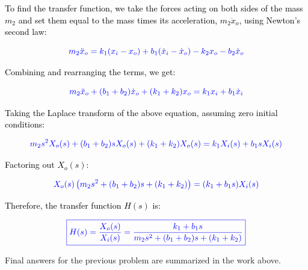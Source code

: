 \documentclass[12pt]{article}
\begin{document}
\noindent
\textcolor{black}{To find the transfer function, we take the forces acting on both sides of the mass \( m_2 \) and set them equal to the mass times its acceleration, \( m_2 \ddot{x}_o \), using Newton’s second law:}

\[
	\textcolor{blue}{m_2 \ddot{x}_o = k_1 (x_i - x_o) + b_1 (\dot{x}_i - \dot{x}_o) - k_2 x_o - b_2 \dot{x}_o}
\]

\noindent
\textcolor{black}{Combining and rearranging the terms, we get:}

\[
	\textcolor{blue}{m_2 \ddot{x}_o + (b_1 + b_2) \dot{x}_o + (k_1 + k_2) x_o = k_1 x_i + b_1 \dot{x}_i}
\]

\noindent
\textcolor{black}{Taking the Laplace transform of the above equation, assuming zero initial conditions:}

\[
	\textcolor{blue}{m_2 s^2 X_o(s) + (b_1 + b_2) s X_o(s) + (k_1 + k_2) X_o(s) = k_1 X_i(s) + b_1 s X_i(s)}
\]

\noindent
\textcolor{black}{Factoring out \( X_o(s) \):}

\[
	\textcolor{blue}{X_o(s) \left( m_2 s^2 + (b_1 + b_2) s + (k_1 + k_2) \right) = (k_1 + b_1 s) X_i(s)}
\]

\noindent
\textcolor{black}{Therefore, the transfer function \( H(s) \) is:}

\[
	\textcolor{blue}{\boxed{H(s) = \frac{X_o(s)}{X_i(s)} = \frac{k_1 + b_1 s}{m_2 s^2 + (b_1 + b_2) s + (k_1 + k_2)}}}
\]


\begin{resultsbox}
Final answers for the previous problem are summarized in the work above.
\end{resultsbox}
\end{document}
